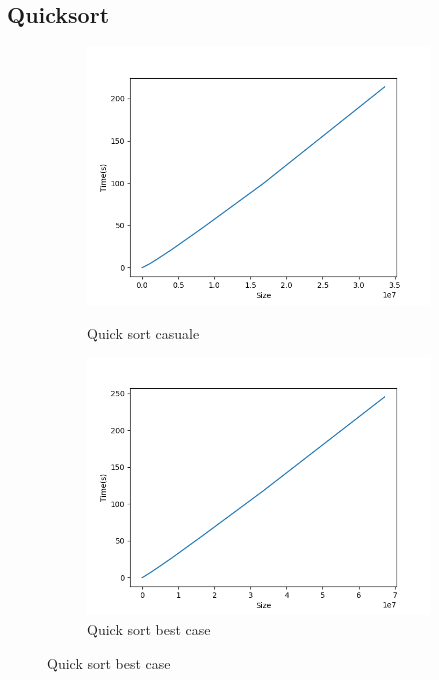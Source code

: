 \documentclass[]{article}
\begin{document}
\subsection{Quicksort}
\begin{figure}[H]
    \centering
    \begin{subfigure}[b]{0.4\linewidth} 
        \centering
        \caption{Quick sort casuale}
        \includegraphics[width=\textwidth]{QuickSortCasuale}
        \label{fig:quick_casuale}
    \end{subfigure}
    \quad
    \begin{subfigure}[b]{0.4\linewidth}
        \centering
        \caption{Quick sort best case}
        \includegraphics[width=\textwidth]{QuickSortBestCase}

\end{subfigure}
\end{figure}
\end{document}

